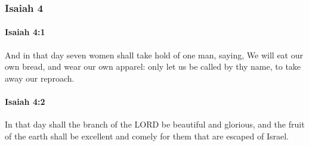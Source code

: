 	\subsubsection{Isaiah 4} %
		\label{ISAIAH-4}

		\paragraph{Isaiah 4:1} %
			\label{ISAIAH-4-1}

			And in that day seven women shall take hold of one man, saying, We will eat our own bread, and wear our own apparel: only let us be called by thy name, to take away our reproach.


		\paragraph{Isaiah 4:2} %
			\label{ISAIAH-4-2}

			In that day shall the branch of the LORD be beautiful and glorious, and the fruit of the earth shall be excellent and comely for them that are escaped of Israel.

